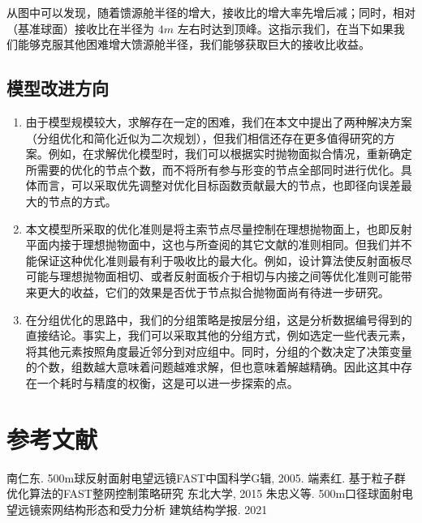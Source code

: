 \documentclass[withoutpreface,bwprint,fontset=macnew]{cumcmthesis} %
\begin{document}
		从图中可以发现，随着馈源舱半径的增大，接收比的增大率先增后减；同时，相对（基准球面）接收比在半径为 $4m$ 左右时达到顶峰。这指示我们，在当下如果我们能够克服其他困难增大馈源舱半径，我们能够获取巨大的接收比收益。

	
	\subsection{模型改进方向}

	\begin{enumerate}
		\item 由于模型规模较大，求解存在一定的困难，我们在本文中提出了两种解决方案（分组优化和简化近似为二次规划），但我们相信还存在更多值得研究的方案。例如，在求解优化模型时，我们可以根据实时抛物面拟合情况，重新确定所需要的优化的节点个数，而不将所有参与形变的节点全部同时进行优化。具体而言，可以采取优先调整对优化目标函数贡献最大的节点，也即径向误差最大的节点的方式。
		\item 本文模型所采取的优化准则是将主索节点尽量控制在理想抛物面上，也即反射平面内接于理想抛物面中，这也与所查阅的其它文献的准则相同。但我们并不能保证这种优化准则最有利于吸收比的最大化。例如，设计算法使反射面板尽可能与理想抛物面相切、或者反射面板介于相切与内接之间等优化准则可能带来更大的收益，它们的效果是否优于节点拟合抛物面尚有待进一步研究。
		\item 在分组优化的思路中，我们的分组策略是按层分组，这是分析数据编号得到的直接结论。事实上，我们可以采取其他的分组方式，例如选定一些代表元素，将其他元素按照角度最近邻分到对应组中。同时，分组的个数决定了决策变量的个数，组数越大意味着问题越难求解，但也意味着解越精确。因此这其中存在一个耗时与精度的权衡，这是可以进一步探索的点。
	\end{enumerate}

	\section{参考文献}
	
	\begin{thebibliography}{9}%
		南仁东.
		\newblock 500m球反射面射电望远镜FAST\allowbreak[A]
		\newblock 中国科学G辑, 2005.
		端素红.
		\newblock 基于粒子群优化算法的FAST整网控制策略研究
		\newblock 东北大学, 2015
		 朱忠义等.
		\newblock 500m口径球面射电望远镜索网结构形态和受力分析
		\newblock 建筑结构学报. 2021
	\end{thebibliography}
	
		\newpage
\end{document}
